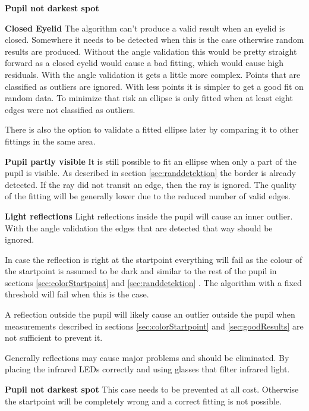 \begin{labeling}{\textbf{Pupil not darkest spot}}
	\item [\textbf{Closed Eyelid}] The algorithm can't produce a valid result when an eyelid is closed. Somewhere it needs to be detected when this is the case otherwise random results are produced. Without the angle validation this would be pretty straight forward as a closed eyelid would cause a bad fitting, which would cause high residuals. With the angle validation it gets a little more complex. Points that are classified as outliers are ignored. With less points it is simpler to get a good fit on random data. To minimize that risk an ellipse is only fitted when at least eight edges were not classified as outliers.
	
	There is also the option to validate a fitted ellipse later by comparing it to other fittings in the same area. 
	\item [\textbf{Pupil partly visible}] It is still possible to fit an ellipse when only a part of the pupil is visible. As described in section \ref{sec:randdetektion} the border is already detected. If the ray did not transit an edge, then the ray is ignored. The quality of the fitting will be generally lower due to the reduced number of valid edges.
	\item [\textbf{Light reflections}] Light reflections inside the pupil will cause an inner outlier. With the angle validation the edges that are detected that way should be ignored.
	
	In case the reflection is right at the startpoint everything will fail as the colour of the startpoint is assumed to be dark and similar to the rest of the pupil in sections \ref{sec:colorStartpoint} and \ref{sec:randdetektion} . The algorithm with a fixed threshold will fail when this is the case.
	
	A reflection outside the pupil will likely cause an outlier outside the pupil when measurements described in sections \ref{sec:colorStartpoint} and \ref{sec:goodResults} are not sufficient to prevent it. 
	
	Generally reflections may cause major problems and should be eliminated. By placing the infrared LEDs correctly and using glasses that filter infrared light.
	\item [\textbf{Pupil not darkest spot}] This case needs to be prevented at all cost. Otherwise the startpoint will be completely wrong and a correct fitting is not possible.
\end{labeling}

